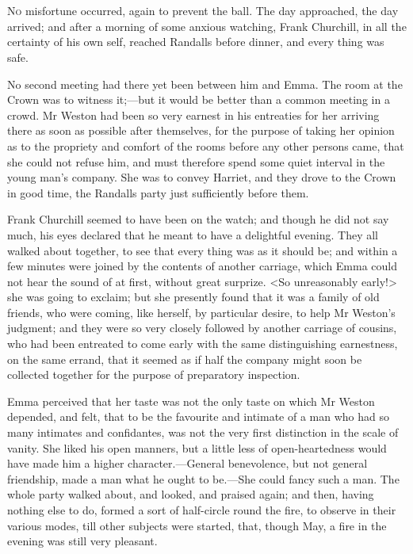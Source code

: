 \chapter[Chapter \thechapter]{}
	
\lettrine[lraise=0.3]{N}{o} misfortune occurred, again to prevent the ball. The day approached, the day arrived; and after a morning of some anxious watching, Frank Churchill, in all the certainty of his own self, reached Randalls before dinner, and every thing was safe.

No second meeting had there yet been between him and Emma. The room at the Crown was to witness it;—but it would be better than a common meeting in a crowd. Mr Weston had been so very earnest in his entreaties for her arriving there as soon as possible after themselves, for the purpose of taking her opinion as to the propriety and comfort of the rooms before any other persons came, that she could not refuse him, and must therefore spend some quiet interval in the young man's company. She was to convey Harriet, and they drove to the Crown in good time, the Randalls party just sufficiently before them.

Frank Churchill seemed to have been on the watch; and though he did not say much, his eyes declared that he meant to have a delightful evening. They all walked about together, to see that every thing was as it should be; and within a few minutes were joined by the contents of another carriage, which Emma could not hear the sound of at first, without great surprize. <So unreasonably early!> she was going to exclaim; but she presently found that it was a family of old friends, who were coming, like herself, by particular desire, to help Mr Weston's judgment; and they were so very closely followed by another carriage of cousins, who had been entreated to come early with the same distinguishing earnestness, on the same errand, that it seemed as if half the company might soon be collected together for the purpose of preparatory inspection.

Emma perceived that her taste was not the only taste on which Mr Weston depended, and felt, that to be the favourite and intimate of a man who had so many intimates and confidantes, was not the very first distinction in the scale of vanity. She liked his open manners, but a little less of open-heartedness would have made him a higher character.—General benevolence, but not general friendship, made a man what he ought to be.—She could fancy such a man. The whole party walked about, and looked, and praised again; and then, having nothing else to do, formed a sort of half-circle round the fire, to observe in their various modes, till other subjects were started, that, though May, a fire in the evening was still very pleasant.

